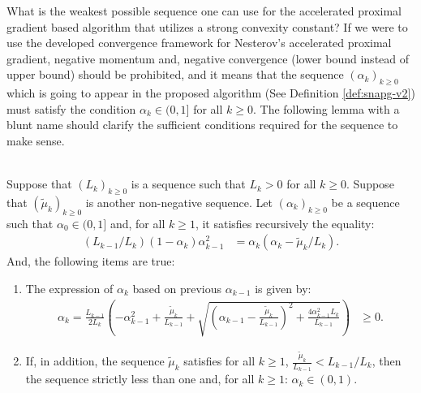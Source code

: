 \documentclass[12pt]{article}
\begin{document}
    What is the weakest possible sequence one can use for the accelerated proximal gradient based algorithm that utilizes a strong convexity constant? 
    If we were to use the developed convergence framework for Nesterov's accelerated proximal gradient, negative momentum and, negative convergence (lower bound instead of upper bound) should be prohibited, and it means that the sequence $(\alpha_k)_{k \ge 0}$ which is going to appear in the proposed algorithm (See Definition \ref{def:snapg-v2}) must satisfy the condition $\alpha_k \in (0, 1]$ for all $k \ge 0$. 
    The following lemma with a blunt name should clarify the sufficient conditions required for the sequence to make sense. 
    \begin{lemma}\;\label{lemma:snapg-v2-seq-range}\\
        Suppose that $(L_k)_{k \ge 0}$ is a sequence such that $L_k > 0$ for all $k \ge 0$. 
        Suppose that $(\tilde\mu_k)_{k\ge 0}$ is another non-negative sequence. 
        Let $(\alpha_k)_{k \ge 0}$ be a sequence such that $\alpha_0 \in (0, 1]$ and, for all $k \ge 1$, it satisfies recursively the equality: 
        \begin{align*}
            (L_{k - 1}/L_k)(1 - \alpha_{k})\alpha_{k - 1}^2 
            &= \alpha_{k}\left(\alpha_{k} - \tilde \mu_k/L_k\right). 
        \end{align*}
        And, the following items are true: 
        \begin{enumerate}
            \item The expression of $\alpha_k$ based on previous $\alpha_{k - 1}$ is given by: 
            \begin{align*}
                \alpha_k = \frac{L_{k - 1}}{2L_k} \left(
                    - \alpha_{k - 1}^2 + \frac{\tilde\mu_k}{L_{k - 1}}
                    + \sqrt{
                        \left(
                            \alpha_{k - 1} - \frac{\tilde\mu_k}{L_{k - 1}}
                        \right)^2
                        + \frac{4\alpha_{k - 1}^2L_k}{L_{k - 1}}
                    }
                \right) &\ge 0. 
            \end{align*}
            \item If, in addition, the sequence $\tilde \mu_k$ satisfies for all $k \ge 1$, $\frac{\tilde \mu_k}{L_{k - 1}} < L_{k - 1}/ L_k$, then the sequence strictly less than one and, for all $k \ge 1$: $\alpha_k \in (0, 1)$. 
        \end{enumerate}
    \end{lemma}
\end{document}
